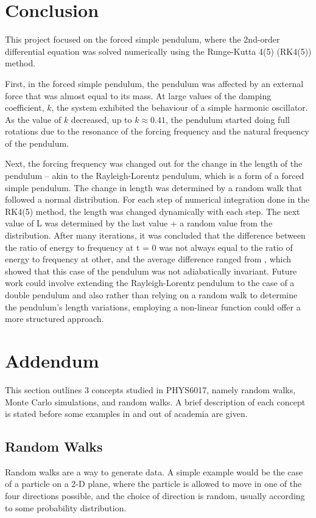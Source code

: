 \documentclass[10pt, twocolumn]{article}
\begin{document}
\section{Conclusion}
This project focused on the forced simple pendulum, where the 2nd-order differential equation was solved numerically using the Runge-Kutta 4(5) (RK4(5)) method.

First, in the forced simple pendulum, the pendulum was affected by an external force that was almost equal to its mass. At large values of the damping coefficient, $k$, the system exhibited the behaviour of a simple harmonic oscillator. As the value of $k$ decreased, up to $k\approx 0.41$, the pendulum started doing full rotations due to the resonance of the forcing frequency and the natural frequency of the pendulum.

Next, the forcing frequency was changed out for the change in the length of the pendulum -- akin to the Rayleigh-Lorentz pendulum, which is a form of a forced simple pendulum. The change in length was determined by a random walk that followed a normal distribution. For each step of numerical integration done in the RK4(5) method, the length was changed dynamically with each step. The next value of L was determined by the last value + a random value from the distribution. After many iterations, it was concluded that the difference between the ratio of energy to frequency at t = 0 was not always equal to the ratio of energy to frequency at other, and the average difference ranged from , which showed that this case of the pendulum was not adiabatically invariant. Future work could involve extending the Rayleigh-Lorentz pendulum to the case of a double pendulum and also rather than relying on a random walk to determine the pendulum's length variations, employing a non-linear function could offer a more structured approach. 
\newpage
\section{Addendum} %
This section outlines 3 concepts studied in PHYS6017, namely random walks, Monte Carlo simulations, and random walks. A brief description of each concept is stated before some examples in and out of academia are given.
\subsection{Random Walks} %
Random walks are a way to generate data. A simple example would be the case of a particle on a 2-D plane, where the particle is allowed to move in one of the four directions possible, and the choice of direction is random, usually according to some probability distribution.
\end{document}
